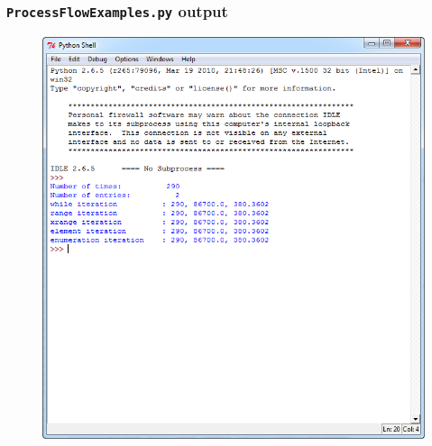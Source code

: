 \documentclass[t]{beamer}
\begin{document}
\begin{frame}[fragile]
\frametitle{\texttt{ProcessFlowExamples.py} output}
  \begin{figure}[ht]
  \centering
        \includegraphics[height=0.85\textheight]{figures/ProcessFlowExamplesPythonShellOutput}
   \end{figure}
\end{frame}
\end{document}
